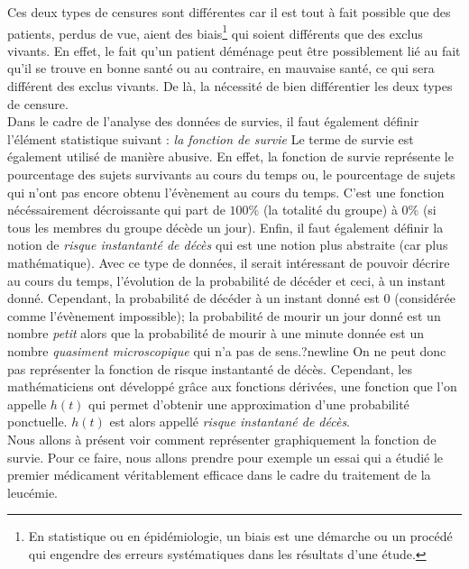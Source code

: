 Ces deux types de censures sont différentes car il est tout à fait possible que des patients, perdus de vue, aient des biais\footnote{En statistique ou en épidémiologie, un biais est une démarche ou un procédé qui engendre des erreurs systématiques dans les résultats d'une étude.} qui soient différents que des exclus vivants. En effet, le fait qu'un patient déménage peut être possiblement lié au fait qu'il se trouve en bonne santé ou au contraire, en mauvaise santé, ce qui sera différent des exclus vivants. De là, la nécessité de bien différentier les deux types de censure.\newline
\\
Dans le cadre de l'analyse des données de survies, il faut également définir l'élément statistique suivant : \textit{la fonction de survie}\newline
Le terme de survie est également utilisé de manière abusive. En effet, la fonction de survie représente le pourcentage des sujets survivants au cours du temps ou, le pourcentage de sujets qui n'ont pas encore obtenu l'évènement au cours du temps. C'est une fonction nécéssairement décroissante qui part de $100\%$ (la totalité du groupe) à $0\%$ (si tous les membres du groupe décède un jour).\newline
Enfin, il faut également définir la notion de \textit{risque instantanté de décès} qui est une notion plus abstraite (car plus mathématique).\newline
Avec ce type de données, il serait intéressant de pouvoir décrire au cours du temps, l'évolution de la probabilité de décéder et ceci, à un instant donné. Cependant, la probabilité de décéder à un instant donné est $0$ (considérée comme l'évènement impossible); la probabilité de mourir un jour donné est un nombre \textit{petit} alors que la probabilité de mourir à une minute donnée est un nombre \textit{quasiment microscopique} qui n'a pas de sens.?newline
On ne peut donc pas représenter la fonction de risque instantanté de décès.\newline
Cependant, les mathématiciens ont développé grâce aux fonctions dérivées, une fonction que l'on appelle $h(t)$ qui permet d'obtenir une approximation d'une probabilité ponctuelle. $h(t)$ est alors appellé \textit{risque instantané de décès}.\newline
\\
Nous allons à présent voir comment représenter graphiquement la fonction de survie. Pour ce faire, nous allons prendre pour exemple un essai qui a étudié le premier médicament véritablement efficace dans le cadre du traitement de la leucémie.

